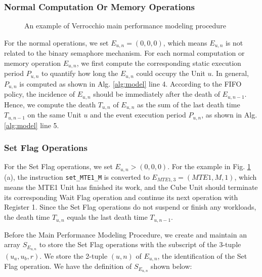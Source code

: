 \documentclass[12pt]{extbook}
\begin{document}
\subsubsection{Normal Computation Or Memory Operations}

\begin{figure}[tbp]
    \caption{An example of Verrocchio main performance modeling procedure}
    \label{fig:modeling}
\end{figure}

For the normal operations, we set $E_{u, n} = (0, 0, 0)$, which means $E_{u, n}$ is not related to the binary semaphore mechanism. For each normal computation or memory operation $E_{u, n}$, we first compute the corresponding static execution period $P_{u, n}$ to quantify how long the $E_{u, n}$ could occupy the Unit $u$. In general,  $P_{u, n}$ is computed as shown in Alg. \ref{alg:model} line 4. According to the FIFO policy, the incidence of $E_{u, n}$ should be immediately after the death of $E_{u, n-1}$. Hence, we compute the death $T_{u, n}$ of $E_{u, n}$ as the sum of the last death time $T_{u, n-1}$ on the same Unit $u$ and the event execution period $P_{u, n}$, as shown in Alg. \ref{alg:model} line 5.

\subsubsection{Set Flag Operations}

For the Set Flag operations, we set $E_{u, n} > (0, 0, 0)$. For the example in Fig. \ref{fig:modeling} (a), the instruction \verb|set_MTE1_M| is converted to $E_{MTE1, 3} = (MTE1, M, 1)$, which means the MTE1 Unit has finished its work, and the Cube Unit should terminate its corresponding Wait Flag operation and continue its next operation with Register 1. Since the Set Flag operations do not suspend or finish any workloads, the death time $T_{u, n}$ equals the last death time $T_{u, n-1}$.

Before the Main Performance Modeling Procedure, we create and maintain an array $S_{E_{u, n}}$ to store the Set Flag operations with the subscript of the 3-tuple $(u_{a}, u_{b}, r)$. We store the 2-tuple $(u, n)$ of $E_{u, n}$, the identification of the Set Flag operation. We have the definition of $S_{E_{u, n}}$ shown below:
\end{document}
